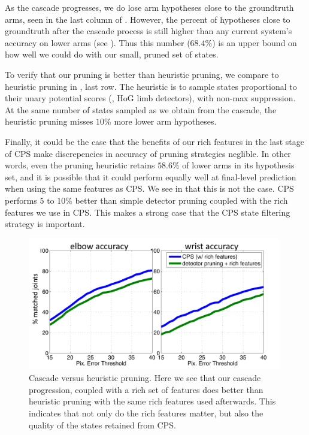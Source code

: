 As the cascade progresses, we do lose arm hypotheses close to the groundtruth 
arms, seen in the last column of .  However, the percent of hypotheses close 
to groundtruth after the cascade process is still higher than any current 
system's accuracy on lower arms (see ).  Thus this number 
($68.4 \%$) is an upper bound on how well we could do with our small, pruned 
set of states.

To verify that our pruning is better than heuristic pruning, we compare to 
heuristic pruning in , last row.  The heuristic is to sample states 
proportional to their unary potential scores (\ie, HoG limb detectors), with 
non-max suppression.  At the same number of states sampled as we obtain from 
the cascade, the heuristic pruning misses $10\%$ more lower arm hypotheses.

Finally, it could be the case that the benefits of our rich features in the 
last stage of CPS make discrepencies in accuracy of pruning strategies 
neglible.  In other words, even the pruning heuristic retains $58.6\%$ of lower 
arms in its hypothesis set, and it is possible that it could perform equally 
well at final-level prediction when using the same features as CPS.  We see in 
 that this is not the case.  CPS performs $5 \text{ 
to } 10\%$ better than simple detector pruning coupled with the rich features 
we use in CPS.  This makes a strong case that the CPS state filtering strategy 
is important.

\begin{figure}[tb]
\begin{center}
\includegraphics[width=0.99\textwidth]{figs/cascade-vs-pruning.pdf}
\caption[Cascade versus heuristic pruning.]{Cascade versus heuristic pruning.  
Here we see that our cascade progression, coupled with a rich set of features 
does better than heuristic pruning with the same rich features used afterwards.  
This indicates that not only do the rich features matter, but also the quality 
of the states retained from CPS.}
\label{fig:cascade-vs-pruning}
\end{center}
\end{figure}


